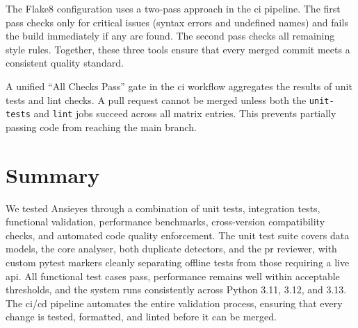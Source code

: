 The Flake8 configuration uses a two-pass approach in the \gls{ci} pipeline. The first pass checks only for critical issues (syntax errors and undefined names) and fails the build immediately if any are found. The second pass checks all remaining style rules. Together, these three tools ensure that every merged commit meets a consistent quality standard.

A unified ``All Checks Pass'' gate in the \gls{ci} workflow aggregates the results of unit tests and lint checks. A pull request cannot be merged unless both the \texttt{unit-tests} and \texttt{lint} jobs succeed across all matrix entries. This prevents partially passing code from reaching the main branch.

\section{Summary}

We tested Ansieyes through a combination of unit tests, integration tests, functional validation, performance benchmarks, cross-version compatibility checks, and automated code quality enforcement. The unit test suite covers data models, the core analyser, both duplicate detectors, and the \gls{pr} reviewer, with custom pytest markers cleanly separating offline tests from those requiring a live \gls{api}. All functional test cases pass, performance remains well within acceptable thresholds, and the system runs consistently across Python 3.11, 3.12, and 3.13. The \gls{ci}/\gls{cd} pipeline automates the entire validation process, ensuring that every change is tested, formatted, and linted before it can be merged.
